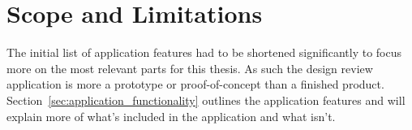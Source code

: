 



\section{Scope and Limitations}
The initial list of application features had to be shortened significantly to focus more on the most relevant parts for this thesis. As such the design review application
is more a prototype or proof-of-concept than a finished product. 
Section~\vref{sec:application_functionality} outlines the application features and will explain more of what's included in the application and what isn't. 

